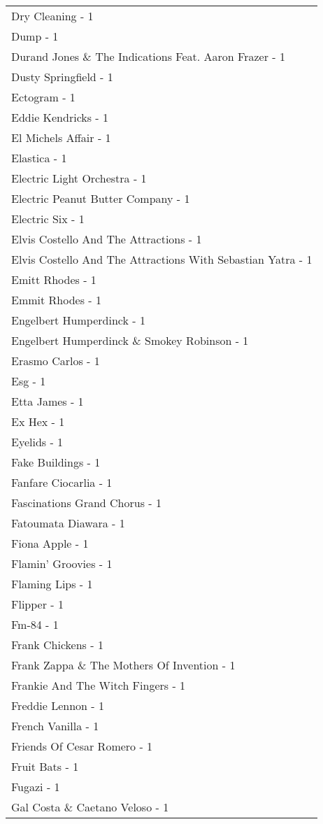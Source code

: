 \documentclass[
]{article}
\begin{document}
\begin{longtable}{l}
Dry Cleaning - 1 \\ 
Dump - 1 \\ 
Durand Jones \& The Indications Feat. Aaron Frazer - 1 \\ 
Dusty Springfield - 1 \\ 
Ectogram - 1 \\ 
Eddie Kendricks - 1 \\ 
El Michels Affair - 1 \\ 
Elastica - 1 \\ 
Electric Light Orchestra - 1 \\ 
Electric Peanut Butter Company - 1 \\ 
Electric Six - 1 \\ 
Elvis Costello And The Attractions - 1 \\ 
Elvis Costello And The Attractions With Sebastian Yatra - 1 \\ 
Emitt Rhodes - 1 \\ 
Emmit Rhodes - 1 \\ 
Engelbert Humperdinck - 1 \\ 
Engelbert Humperdinck \& Smokey Robinson - 1 \\ 
Erasmo Carlos - 1 \\ 
Esg - 1 \\ 
Etta James - 1 \\ 
Ex Hex - 1 \\ 
Eyelids - 1 \\ 
Fake Buildings - 1 \\ 
Fanfare Ciocarlia - 1 \\ 
Fascinations Grand Chorus - 1 \\ 
Fatoumata Diawara - 1 \\ 
Fiona Apple - 1 \\ 
Flamin' Groovies - 1 \\ 
Flaming Lips - 1 \\ 
Flipper - 1 \\ 
Fm-84 - 1 \\ 
Frank Chickens - 1 \\ 
Frank Zappa \& The Mothers Of Invention - 1 \\ 
Frankie And The Witch Fingers - 1 \\ 
Freddie Lennon - 1 \\ 
French Vanilla - 1 \\ 
Friends Of Cesar Romero - 1 \\ 
Fruit Bats - 1 \\ 
Fugazi - 1 \\ 
Gal Costa \& Caetano Veloso - 1 \\ 

\end{longtable}
\end{document}
